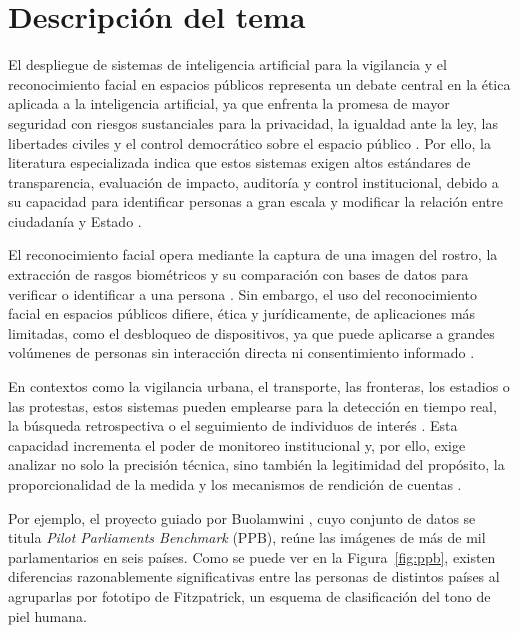 \documentclass[11pt, a4paper]{article}
\begin{document}
\section{Descripción del tema}

El despliegue de sistemas de inteligencia artificial para la vigilancia y el reconocimiento facial en espacios públicos representa un debate central en la ética aplicada a la inteligencia artificial, ya que enfrenta la promesa de mayor seguridad con riesgos sustanciales para la privacidad, la igualdad ante la ley, las libertades civiles y el control democrático sobre el espacio público \citep{schmechel2021, martinez2024}. Por ello, la literatura especializada indica que estos sistemas exigen altos estándares de transparencia, evaluación de impacto, auditoría y control institucional, debido a su capacidad para identificar personas a gran escala y modificar la relación entre ciudadanía y Estado \citep{gimenez2022, silva2020}.

El reconocimiento facial opera mediante la captura de una imagen del rostro, la extracción de rasgos biométricos y su comparación con bases de datos para verificar o identificar a una persona \citep{silva2020}. Sin embargo, el uso del reconocimiento facial en espacios públicos difiere, ética y jurídicamente, de aplicaciones más limitadas, como el desbloqueo de dispositivos, ya que puede aplicarse a grandes volúmenes de personas sin interacción directa ni consentimiento informado \citep{martinez2024, gimenez2022}.

En contextos como la vigilancia urbana, el transporte, las fronteras, los estadios o las protestas, estos sistemas pueden emplearse para la detección en tiempo real, la búsqueda retrospectiva o el seguimiento de individuos de interés \citep{gimenez2022, schmechel2021}. Esta capacidad incrementa el poder de monitoreo institucional y, por ello, exige analizar no solo la precisión técnica, sino también la legitimidad del propósito, la proporcionalidad de la medida y los mecanismos de rendición de cuentas \citep{silva2020, schmechel2021}.

Por ejemplo, el proyecto guiado por Buolamwini \citep{buolamwini2018}, cuyo conjunto de datos se titula \textit{Pilot Parliaments Benchmark} (PPB), reúne las imágenes de más de mil parlamentarios en seis países. Como se puede ver en la Figura~\ref{fig:ppb}, existen diferencias razonablemente significativas entre las personas de distintos países al agruparlas por fototipo de Fitzpatrick, un esquema de clasificación del tono de piel humana.
\end{document}
